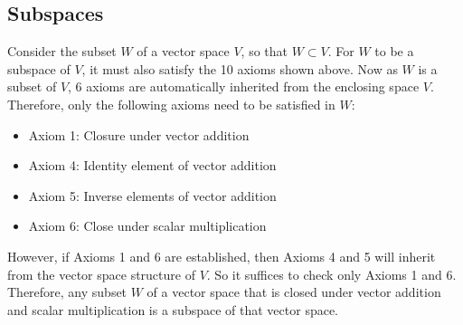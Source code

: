 \documentclass{article}
\begin{document}
\subsection{Subspaces}
Consider the subset \(W\) of a vector space \(V\), so that \(W \subset
V\). For \(W\) to be a subspace of \(V\), it must also satisfy the 10
axioms shown above. Now as \(W\) is a subset of \(V\), 6 axioms are
automatically inherited from the enclosing space \(V\).
Therefore, only the following axioms need to be satisfied in \(W\):
\begin{itemize}
    \item Axiom 1: Closure under vector addition
    \item Axiom 4: Identity element of vector addition
    \item Axiom 5: Inverse elements of vector addition
    \item Axiom 6: Close under scalar multiplication
\end{itemize}
However, if Axioms 1 and 6 are established, then Axioms 4 and 5 will inherit from
the vector space structure of \(V\). So it suffices to check only Axioms 1 and 6.
Therefore, any subset \(W\) of a vector space that is closed under
vector addition and scalar multiplication is a subspace of that vector
space.
\end{document}
